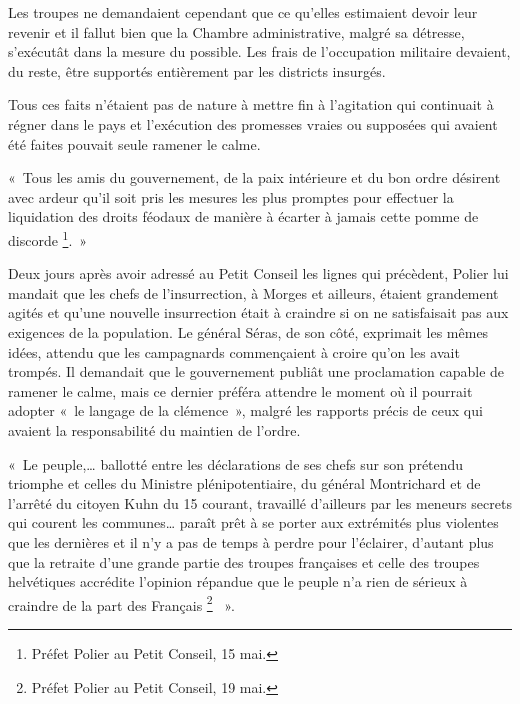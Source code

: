 \documentclass[french,twoside]{book} %
\newenvironment{quoteblock}%
  {\begin{quoting}}
  {\end{quoting}}
\newenvironment{quotebar}{%
    \def\FrameCommand{{\color{rubric!10!}\vrule width 0.5em} \hspace{0.9em}}%
    \def\OuterFrameSep{\itemsep} %
    \MakeFramed {\advance\hsize-\width \FrameRestore}
  }%
  {%
    \endMakeFramed
  }
\renewenvironment{quoteblock}%
  {%
    \savenotes
    \setstretch{0.9}
    \normalfont
    \begin{quotebar}
  }
  {%
    \end{quotebar}
    \spewnotes
  }
\begin{document}
\noindent Les troupes ne demandaient cependant que ce qu’elles estimaient devoir leur revenir et il fallut bien que la Chambre administrative, malgré sa détresse, s’exécutât dans la mesure du possible. Les frais de l’occupation militaire devaient, du reste, être supportés entièrement par les districts insurgés.\par
Tous ces faits n’étaient pas de nature à mettre fin à l’agitation qui continuait à régner dans le pays et l’exécution des promesses vraies ou supposées qui avaient été faites pouvait seule ramener le calme.\par

\begin{quoteblock}
 \noindent « Tous les amis du gouvernement, de la paix intérieure et du bon ordre désirent avec ardeur qu’il soit pris les mesures les plus promptes pour effectuer la liquidation des droits féodaux de manière à écarter à jamais cette pomme de discorde \footnote{Préfet Polier au Petit Conseil, 15 mai.}. »
 \end{quoteblock}

\noindent Deux jours après avoir adressé au Petit Conseil les lignes qui précèdent, Polier lui mandait que les chefs de l’insurrection, à Morges et ailleurs, étaient grandement agités et qu’une nouvelle insurrection était à craindre si on ne satisfaisait pas aux exigences de la population. Le général Séras, de son côté, exprimait les mêmes idées, attendu que les campagnards commençaient à croire qu’on les avait trompés. Il demandait que le gouvernement publiât une proclamation capable de ramener le calme, mais ce dernier préféra attendre le moment où il pourrait adopter « le langage de la clémence », malgré les rapports précis de ceux qui avaient la responsabilité du maintien de l’ordre.\par

\begin{quoteblock}
 \noindent « Le peuple,… ballotté entre les déclarations de ses chefs sur son prétendu triomphe et celles du Ministre plénipotentiaire, du général Montrichard et de l’arrêté du citoyen Kuhn du 15 courant, travaillé d’ailleurs par les meneurs secrets qui courent les communes… paraît prêt à se porter aux extrémités plus violentes que les dernières et il n’y a pas de temps à perdre pour l’éclairer, d’autant plus que la retraite d’une grande partie des troupes françaises et celle des troupes helvétiques accrédite l’opinion répandue que le peuple n’a rien de sérieux à craindre de la part des Français \footnote{Préfet Polier au Petit Conseil, 19 mai.}  ».
 \end{quoteblock}
\end{document}

